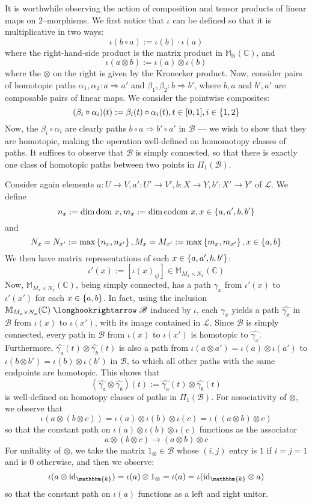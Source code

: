 \documentclass{amsart}
\newcommand{\M}{\mathbb{M}}
\newcommand{\N}{\mathbb{N}}
\newcommand{\C}{\mathbb{C}}
\newcommand{\K}{\mathbbm{k}}
\newcommand{\s}{\mathscr}
\newcommand{\wh}{\widehat}
\newcommand{\tensor}{\otimes}
\renewcommand{\to}[1][]{\stackrel{#1}{\longrightarrow}}
\newcommand{\hto}[1][]{\stackrel{#1}{\longhookrightarrow}}
\newcommand{\To}[1][]{\stackrel{#1}{\Longrightarrow}}
\newcommand{\codom}{\text{codom }}
\newcommand{\dom}{\text{dom }}
\newcommand{\id}{\text{id}}
\newcommand{\curly}[1]{\left\{ #1 \right\}}
\newcommand{\set}[2][]{\ifthenelse{\equal{#1}{}}
                                  {\curly{#2}}
                                  {\curly{#1\ \textbf{:}\ #2}}}
\numberwithin{thm}{section}
\theoremstyle{definition}
\begin{document}
It is worthwhile observing the action of composition and tensor products of
linear maps on $2$--morphisms. We first notice that $\iota$ can be defined so that
it is multiplicative in two ways:
\[
  \iota(b \circ a) := \iota(b) \cdot \iota(a)
\]
where the right-hand-side product is the matrix product in $\M_{\N}(\C)$, and
\[
  \iota(a \tensor b) := \iota(a) \tensor \iota(b)
\]
where the $\tensor$ on the right is given by the Kronecker product. Now,
consider pairs of homotopic paths
$\alpha_1, \alpha_2 : a \To a'$ and
$\beta_1, \beta_2 : b \To b'$, where $b, a$ and $b', a'$ are
composable pairs of linear maps. We consider the pointwise composites:
\begin{equation}\label{eqn:pointwise_comp}
  (\beta_i \circ \alpha_i)(t) := \beta_i(t) \circ \alpha_i(t), t \in [0, 1],
    i \in \set{1, 2}
\end{equation}
Now, the $\beta_i \circ \alpha_i$ are clearly paths
$b \circ a \To b' \circ a'$ in $\s{B}$ --- we wish to show that
they are homotopic, making the operation well-defined on homomotopy classes of
paths. It suffices to observe that $\s{B}$ is simply connected, so that there is
exactly one class of homotopic paths between two points in $\Pi_1(\s{B})$.

Consider again elements
$a : U \to V, a' : U' \to V', b : X \to Y, b' : X' \to Y'$ of $\s{L}$. We define
\[
  n_x := \dim \dom x, m_x := \dim \codom x, x \in \set{a, a', b, b'}
\]
and
\[
  N_{x} = N_{x'} := \max\set{n_x, n_{x'}},
  M_{x} = M_{x'} := \max\set{m_x, m_{x'}}, x \in \set{a, b}
\]
We then have matrix representations of each $x \in \set{a, a', b, b'}$:
\[
  \iota'(x) := [\iota(x)_{ij}] \in \M_{M_x \times N_x}(\C)
\]
Now, $\M_{M_x \times N_x}(\C)$, being simply connected, has a path
$\gamma_x$ from $\iota'(x)$ to $\iota'(x')$ for each $x \in \set{a, b}$. In
fact, using the inclusion $\M_{M_x \times N_x}(\C) \hto \s{B}$ induced by
$\iota$, each $\gamma_x$ yields a path $\wh{\gamma_x}$ in $\s{B}$ from
$\iota(x)$ to $\iota(x')$, with its image contained in $\s{L}$. Since $\s{B}$ is
simply connected, every path in $\s{B}$ from $\iota(x)$ to $\iota(x')$ is
homotopic to $\wh{\gamma_x}$. Furthermore,
$\wh{\gamma_a}(t) \tensor \wh{\gamma_b}(t)$ is also a path from
$\iota(a \tensor a') = \iota(a) \tensor \iota(a')$ to
$\iota(b \tensor b') = \iota(b) \tensor \iota(b')$ in $\s{B}$, to which all
other paths with the same endpoints are homotopic. This shows that
\[
  (\wh{\gamma_a} \tensor \wh{\gamma_b})(t) :=
    \wh{\gamma_a}(t) \tensor \wh{\gamma_b}(t)
\]
is well-defined on homotopy classes of paths in $\Pi_1(\s{B})$. For
associativity of $\tensor$, we observe that
\[
  \iota(a \tensor (b \tensor c))
    = \iota(a) \tensor \iota(b) \tensor \iota(c)
    = \iota((a \tensor b) \tensor c)
\]
so that the constant path on $\iota(a) \tensor \iota(b) \tensor \iota(c)$
functions as the associator
\[
  a \tensor (b \tensor c) \to (a \tensor b) \tensor c
\]
For unitality of $\tensor$, we take the matrix $1_{\tensor} \in \s{B}$ whose
$(i, j)$ entry is $1$ if $i = j = 1$ and is $0$ otherwise, and then we observe:
\[
  \iota(a \tensor \id_{\K}) = \iota(a) \tensor 1_{\tensor} = \iota(a)
    = \iota(\id_{\K} \tensor a)
\]
so that the constant path on $\iota(a)$ functions as a left and right unitor.
\end{document}
